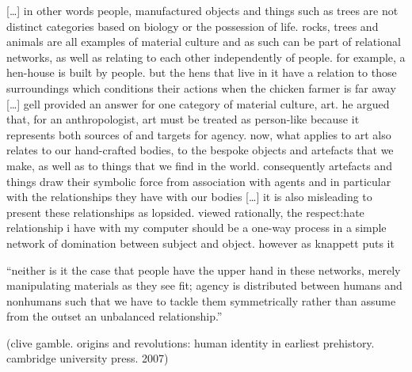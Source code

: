 \documentclass[12pt,a4paper,british,landscape]{article}
\begin{document}
\begin{center}


[\dots] in other words people, manufactured objects and things such as trees are not distinct categories based on biology or the possession of life.
rocks, trees and animals are all examples of material culture and as such can be part of relational networks, as well as relating to each other independently of people.
for example, a hen-house is built by people.
but the hens that live in it have a relation to those surroundings which conditions their actions when the chicken farmer is far away [\dots]
gell provided an answer for one category of material culture, art.
he argued that, for an anthropologist, art must be treated as person-like because it represents both sources of and targets for agency.
now, what applies to art also relates to our hand-crafted bodies, to the bespoke objects and artefacts that we make, as well as to things that we find in the world.
consequently artefacts and things draw their symbolic force from association with agents and in particular with the relationships they have with our bodies [\dots]
it is also misleading to present these relationships as lopsided.
viewed rationally, the respect:hate relationship i have with my computer should be a one-way process in a simple network of domination between subject and object.
however as knappett puts it

\vspace{0.2cm}

``neither is it the case that people have the upper hand in these networks, merely manipulating materials as they see fit; agency is distributed between humans and nonhumans such that we have to tackle them symmetrically rather than assume from the outset an unbalanced relationship.''

\vspace{0.5cm}

(clive gamble. origins and revolutions: human identity in earliest prehistory. cambridge university press. 2007)


\end{center}
\end{document}
